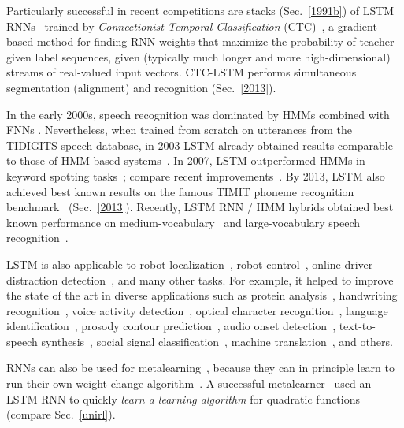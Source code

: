 \documentclass[letterpaper]{article}
\begin{document}
\begin{CJK*}{UTF8}{gbsn}
\begin{sloppypar}
Particularly successful in recent competitions are stacks (Sec.~\ref{1991b}) of LSTM RNNs~\citep{Santi:07ijcai,graves:2009nips} trained by {\em Connectionist Temporal Classification} (CTC)~\citep{Graves:06icml},
a gradient-based method for finding RNN weights that
maximize the probability of teacher-given label sequences, 
given (typically much longer and more high-dimensional) 
streams of real-valued input vectors.
CTC-LSTM performs simultaneous segmentation (alignment) and recognition
(Sec.~\ref{2013}).


In the early 2000s,  
speech recognition was dominated by
HMMs combined with FNNs \citep[e.g.,][]{bourlard+morgan:1994}.
Nevertheless, when trained from scratch on utterances from the
TIDIGITS speech database, in 2003 
LSTM already obtained results comparable to those of 
HMM-based systems~\citep{graves+eck+beringer+schmidhuber:2003,beringer:05icann,Graves:06icml}.
In 2007, LSTM outperformed HMMs in keyword spotting tasks~\citep{DBLP:conf/icann/FernandezGS07};
compare recent improvements~\citep{indermuhle2011keyword,woellmer2013}.
By 2013, LSTM also achieved best known results  on the famous 
TIMIT phoneme recognition benchmark~\citep{graves:2013icassp} (Sec.~\ref{2013}). 
Recently, LSTM RNN / HMM hybrids obtained best known performance on medium-vocabulary~\citep{geiger2014} and
large-vocabulary speech recognition~\citep{sak2014large}.

LSTM is also applicable to
robot localization~\citep{foerster-esann07},
robot control~\citep{mayer2008}, 
online driver distraction detection~\citep{woellmer2011},
and many other tasks. For example, 
it  helped to  improve the state of the art in diverse applications such as 
protein analysis~\citep{hochreiter:snowbird},
handwriting recognition~\citep{graves:08nips,Graves:09tpami,graves:2009nips,bluche13},
voice activity detection~\citep{eyben2013},
optical character recognition~\citep{breuel2013high},
language identification~\citep{gonzalez2014},
prosody contour prediction~\citep{fernandez2014},
audio onset detection~\citep{marchi2014},
text-to-speech synthesis~\citep{fan2014},
social signal classification~\citep{brueckner2014},
machine translation~\citep{sutskever2014},
 and others.

RNNs can also be used for 
metalearning~\citep{schmidhuber87,scholarpedia2010,prokhorov2002meta},
because they can in principle learn to run their own weight change algorithm~\citep{Schmidhuber:93selfrefann}. 
A successful metalearner~\citep{Hochreiter:01meta}
used an LSTM RNN to quickly {\em learn a  learning algorithm} for quadratic functions
(compare Sec.~\ref{unirl}). 



\end{sloppypar}
\end{CJK*}
\end{document}
